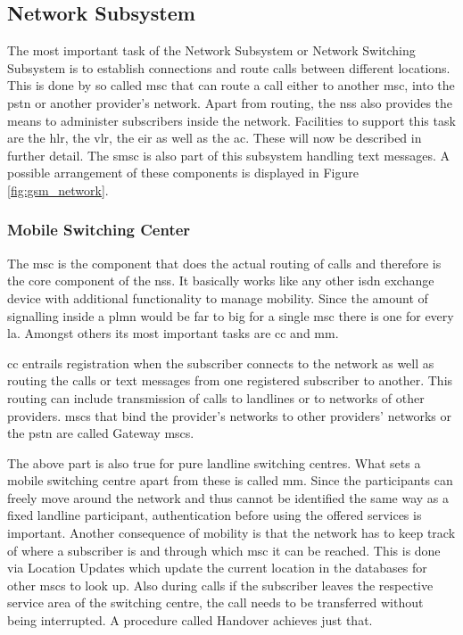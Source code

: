 \subsection{Network Subsystem}
\label{sec:nss}
The most important task of the Network Subsystem or Network Switching Subsystem is to establish connections and route calls between different locations.
This is done by so called \gls{msc} that can route a call either to another \gls{msc}, into the \gls{pstn} or another provider's network.
Apart from routing, the \gls{nss} also provides the means to administer subscribers inside the network.
Facilities to support this task are the \gls{hlr}, the \gls{vlr}, the \gls{eir} as well as the \gls{ac}.
These will now be described in further detail.
The \gls{smsc} is also part of this subsystem handling text messages.
A possible arrangement of these components is displayed in Figure \ref{fig:gsm_network}.

\subsubsection{Mobile Switching Center}
The \gls{msc} is the component that does the actual routing of calls and therefore is the core component of the \gls{nss}.
It basically works like any other \gls{isdn} exchange device with additional functionality to manage mobility.
Since the amount of signalling inside a \gls{plmn} would be far to big for a single \gls{msc} there is one for every \gls{la}.
Amongst others its most important tasks are \gls{cc} and \gls{mm}.

\gls{cc} entrails registration when the subscriber connects to the network as well as routing the calls or text messages from one registered subscriber to another. 
This routing can include transmission of calls to landlines or to networks of other providers.
\glspl{msc} that bind the provider's networks to other providers' networks or the \gls{pstn} are called Gateway \glspl{msc}.

The above part is also true for pure landline switching centres.
What sets a mobile switching centre apart from these is called \gls{mm}.
Since the participants can freely move around the network  and thus cannot be identified the same way as a fixed landline participant, authentication before using the offered services is important.
Another consequence of mobility is that the network has to keep track of where a subscriber is and through which \gls{msc} it can be reached.
This is done via  Location Updates which update the current location in the databases for other \glspl{msc} to look up.
Also during calls if the subscriber leaves the respective service area of the switching centre, the call needs to be transferred without being interrupted.
A procedure called Handover achieves just that.

